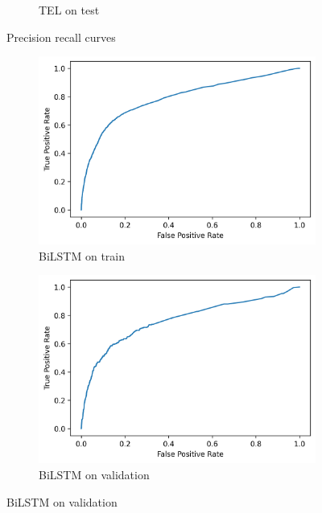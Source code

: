 \documentclass[utf8x]{ctexart}
\begin{document}
\begin{figure}[htb]
\begin{subfigure}[b]{0.32\textwidth}
    \caption{TEL on test}
    \label{fig:Transformer_prc_test}
  \end{subfigure}

  \caption{Precision recall curves}
  \label{fig:prc}
\end{figure}


\begin{figure}[htb]
  \centering
  \begin{subfigure}[b]{0.32\textwidth}
    \centering
    \includegraphics[width=\textwidth]{../images/BiLSTM_train_roc.png}
    \caption{BiLSTM on train}
    \label{fig:BiLSTM_roc_train}
  \end{subfigure}
  \begin{subfigure}[b]{0.32\textwidth}
    \centering
    \includegraphics[width=\textwidth]{../images/BiLSTM_val_roc.png}
    \caption{BiLSTM on validation}
    \label{fig:BiLSTM_roc_val}

\end{subfigure}
\end{figure}
\end{document}
